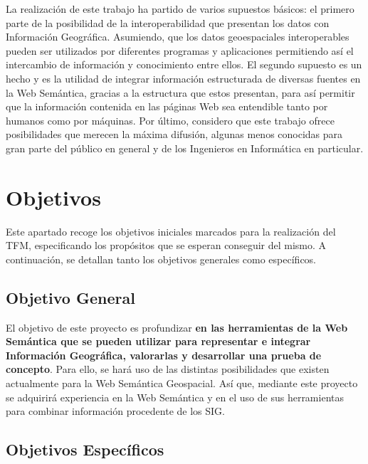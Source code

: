 La realización de este trabajo ha partido de varios supuestos básicos: el primero parte de la posibilidad de la interoperabilidad que presentan los datos con Información Geográfica. Asumiendo, que los datos geoespaciales interoperables pueden ser utilizados por diferentes programas y aplicaciones permitiendo así el intercambio de información y conocimiento entre ellos. El segundo supuesto es un hecho y es la utilidad de integrar información estructurada de diversas fuentes en la Web Semántica, gracias a la estructura que estos presentan, para así permitir que la información contenida en las páginas Web sea entendible tanto por humanos como por máquinas. Por último, considero que este trabajo ofrece posibilidades que merecen la máxima difusión, algunas menos conocidas para gran parte del público en general y de los Ingenieros en Informática en particular.


\section{Objetivos}


Este apartado recoge los objetivos iniciales marcados para la realización del TFM, especificando los propósitos que se esperan conseguir del mismo. A continuación, se detallan tanto los objetivos generales como específicos.

\subsection{Objetivo General}

El objetivo de este proyecto es profundizar \textbf{en las herramientas de la Web Semántica que se pueden utilizar para representar e integrar Información Geográfica, valorarlas y desarrollar una prueba de concepto}. Para ello, se hará uso de las distintas posibilidades que existen actualmente para la Web Semántica Geospacial. Así que, mediante este proyecto se adquirirá experiencia en la Web Semántica y en el uso de sus herramientas para combinar información procedente de los SIG.

\subsection{Objetivos Específicos}

